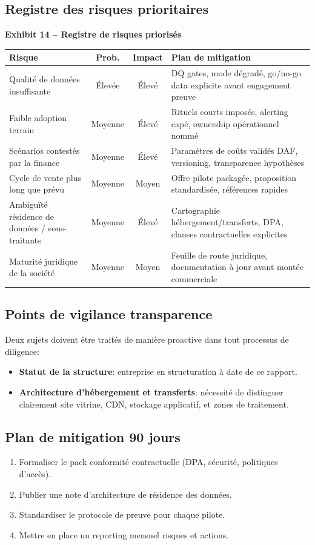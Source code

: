 \documentclass[11pt,a4paper]{article}
\newcommand{\exhibit}[1]{\vspace{2mm}\noindent\colorbox{PraedixaLight}{\parbox{\dimexpr\linewidth-2\fboxsep\relax}{\textbf{#1}}}\vspace{1mm}}
\begin{document}
\subsection{Registre des risques prioritaires}
\exhibit{Exhibit 14 -- Registre de risques priorisés}
\begin{tabularx}{\linewidth}{@{}l c c X@{}}
\toprule
\textbf{Risque} & \textbf{Prob.} & \textbf{Impact} & \textbf{Plan de mitigation} \\
\midrule
Qualité de données insuffisante & Élevée & Élevé & DQ gates, mode dégradé, go/no-go data explicite avant engagement preuve \\
Faible adoption terrain & Moyenne & Élevé & Rituels courts imposés, alerting capé, ownership opérationnel nommé \\
Scénarios contestés par la finance & Moyenne & Élevé & Paramètres de coûts validés DAF, versioning, transparence hypothèses \\
Cycle de vente plus long que prévu & Moyenne & Moyen & Offre pilote packagée, proposition standardisée, références rapides \\
Ambiguïté résidence de données / sous-traitants & Moyenne & Élevé & Cartographie hébergement/transferts, DPA, clauses contractuelles explicites \\
Maturité juridique de la société & Moyenne & Moyen & Feuille de route juridique, documentation à jour avant montée commerciale \\
\bottomrule
\end{tabularx}

\subsection{Points de vigilance transparence}
Deux sujets doivent être traités de manière proactive dans tout processus de diligence:
\begin{itemize}
  \item \textbf{Statut de la structure}: entreprise en structuration à date de ce rapport.
  \item \textbf{Architecture d'hébergement et transferts}: nécessité de distinguer clairement site vitrine, CDN, stockage applicatif, et zones de traitement.
\end{itemize}

\subsection{Plan de mitigation 90 jours}
\begin{enumerate}
  \item Formaliser le pack conformité contractuelle (DPA, sécurité, politiques d'accès).
  \item Publier une note d'architecture de résidence des données.
  \item Standardiser le protocole de preuve pour chaque pilote.
  \item Mettre en place un reporting mensuel risques et actions.
\end{enumerate}
\end{document}
